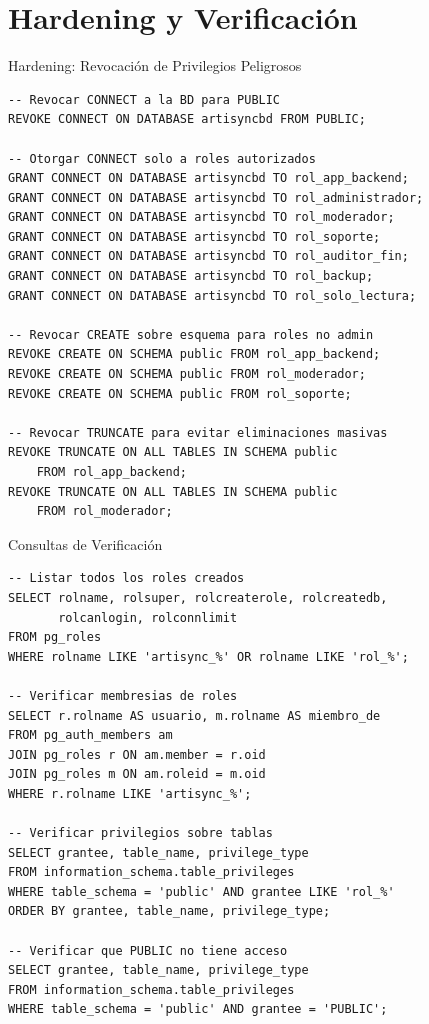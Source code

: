 \documentclass[aspectratio=169]{beamer}
\begin{document}
\section{Hardening y Verificación}

\begin{frame}{Hardening: Revocación de Privilegios Peligrosos}
    \begin{lstlisting}[title={Revocación explícita y endurecimiento}]
-- Revocar CONNECT a la BD para PUBLIC
REVOKE CONNECT ON DATABASE artisyncbd FROM PUBLIC;

-- Otorgar CONNECT solo a roles autorizados
GRANT CONNECT ON DATABASE artisyncbd TO rol_app_backend;
GRANT CONNECT ON DATABASE artisyncbd TO rol_administrador;
GRANT CONNECT ON DATABASE artisyncbd TO rol_moderador;
GRANT CONNECT ON DATABASE artisyncbd TO rol_soporte;
GRANT CONNECT ON DATABASE artisyncbd TO rol_auditor_fin;
GRANT CONNECT ON DATABASE artisyncbd TO rol_backup;
GRANT CONNECT ON DATABASE artisyncbd TO rol_solo_lectura;

-- Revocar CREATE sobre esquema para roles no admin
REVOKE CREATE ON SCHEMA public FROM rol_app_backend;
REVOKE CREATE ON SCHEMA public FROM rol_moderador;
REVOKE CREATE ON SCHEMA public FROM rol_soporte;

-- Revocar TRUNCATE para evitar eliminaciones masivas
REVOKE TRUNCATE ON ALL TABLES IN SCHEMA public
    FROM rol_app_backend;
REVOKE TRUNCATE ON ALL TABLES IN SCHEMA public
    FROM rol_moderador;
    \end{lstlisting}
\end{frame}

\begin{frame}{Consultas de Verificación}
    \begin{lstlisting}[title={Validar la configuracion de seguridad}]
-- Listar todos los roles creados
SELECT rolname, rolsuper, rolcreaterole, rolcreatedb,
       rolcanlogin, rolconnlimit
FROM pg_roles
WHERE rolname LIKE 'artisync_%' OR rolname LIKE 'rol_%';

-- Verificar membresias de roles
SELECT r.rolname AS usuario, m.rolname AS miembro_de
FROM pg_auth_members am
JOIN pg_roles r ON am.member = r.oid
JOIN pg_roles m ON am.roleid = m.oid
WHERE r.rolname LIKE 'artisync_%';

-- Verificar privilegios sobre tablas
SELECT grantee, table_name, privilege_type
FROM information_schema.table_privileges
WHERE table_schema = 'public' AND grantee LIKE 'rol_%'
ORDER BY grantee, table_name, privilege_type;

-- Verificar que PUBLIC no tiene acceso
SELECT grantee, table_name, privilege_type
FROM information_schema.table_privileges
WHERE table_schema = 'public' AND grantee = 'PUBLIC';
    \end{lstlisting}
\end{frame}
\end{document}

